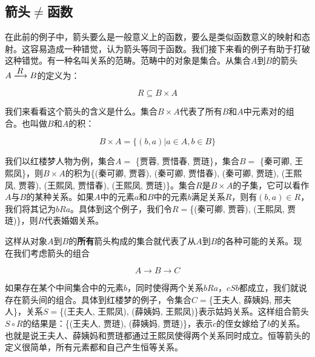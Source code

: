 \documentclass{article}
\begin{document}
\begin{Exercise}
\end{Exercise}

\subsection{箭头$\neq$函数}

在此前的例子中，箭头要么是一般意义上的函数，要么是类似函数意义的映射和态射。这容易造成一种错觉，认为箭头等同于函数。我们接下来看的例子有助于打破这种错觉。有一种名叫关系的范畴。范畴中的对象是集合。从集合$A$到$B$的箭头$A \arrowto{R} B$的定义为：

\[
R \subseteq B \times A
\]

我们来看看这个箭头的含义是什么。集合$B \times A$代表了所有$B$和$A$中元素对的组合。也叫做$B$和$A$的积：

\[
B \times A = \{(b, a) | a \in A, b \in B\}
\]

我们以红楼梦人物为例，集合$A =$ \{贾蓉, 贾惜春, 贾琏\}，集合$B =$ \{秦可卿, 王熙凤\}，则$B \times A$的积为\{(秦可卿, 贾蓉), (秦可卿, 贾惜春), (秦可卿, 贾琏), (王熙凤, 贾蓉), (王熙凤, 贾惜春), (王熙凤, 贾琏)\}。集合$R$是$B \times A$的子集，它可以看作$A$与$B$的某种关系。如果$A$中的元素$a$和$B$中的元素$b$满足关系$R$，则有$(b, a) \in R$，我们将其记为$bRa$。具体到这个例子，我们令$R=$\{(秦可卿, 贾蓉), (王熙凤, 贾琏)\}，则$R$代表婚姻关系。

这样从对象$A$到$B$的\textbf{所有}箭头构成的集合就代表了从$A$到$B$的各种可能的关系。现在我们考虑箭头的组合

\[
A \to B \to C
\]

如果存在某个中间集合中的元素$b$，同时使得两个关系$bRa$，$cSb$都成立，我们就说存在箭头间的组合。具体到红楼梦的例子，令集合$C=$\{王夫人, 薛姨妈, 邢夫人\}，关系$S=$\{(王夫人, 王熙凤), (薛姨妈, 王熙凤)\}表示姑妈关系。这样组合箭头$S \circ R$的结果是：\{(王夫人, 贾琏), (薛姨妈, 贾琏)\}，表示$c$的侄女嫁给了$b$的关系。也就是说王夫人、薛姨妈和贾琏都通过王熙凤使得两个关系同时成立。恒等箭头的定义很简单，所有元素都和自己产生恒等关系。
\end{document}
